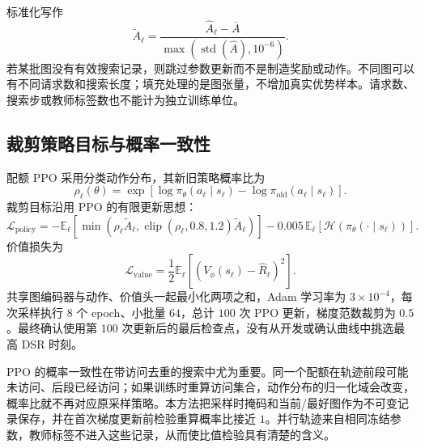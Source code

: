 标准化写作
\begin{equation}
 \widetilde A_\ell=\frac{\widehat A_\ell-\overline A}
 {\max(\operatorname{std}(\widehat A),10^{-6})}.
 \label{legacy:eq:ch5-adv-normalization}
\end{equation}
若某批图没有有效搜索记录，则跳过参数更新而不是制造奖励或动作。不同图可以有不同请求数和搜索长度；填充处理的是图张量，不增加真实优势样本。请求数、搜索步或教师标签数也不能计为独立训练单位。

\subsection{裁剪策略目标与概率一致性}

配额 PPO 采用分类动作分布，其新旧策略概率比为
\begin{equation}
 \rho_\ell(\theta)=
 \exp\left[\log\pi_\theta(a_\ell\mid s_\ell)
          -\log\pi_{\mathrm{old}}(a_\ell\mid s_\ell)\right].
 \label{legacy:eq:ch5-search-ratio}
\end{equation}
裁剪目标沿用 PPO 的有限更新思想\cite{schulman2017proximal}：
\begin{equation}
 \mathcal L_{\mathrm{policy}}=-\mathbb E_\ell\left[
 \min\left(\rho_\ell\widetilde A_\ell,
 \operatorname{clip}(\rho_\ell,0.8,1.2)\widetilde A_\ell\right)\right]
 -0.005\,\mathbb E_\ell[\mathcal H(\pi_\theta(\cdot\mid s_\ell))].
 \label{legacy:eq:ch5-search-ppo}
\end{equation}
价值损失为
\begin{equation}
 \mathcal L_{\mathrm{value}}=
 \frac12\mathbb E_\ell\left[(V_\phi(s_\ell)-\widehat R_\ell)^2\right].
 \label{legacy:eq:ch5-search-value}
\end{equation}
共享图编码器与动作、价值头一起最小化两项之和，Adam 学习率为 $3\times10^{-4}$，每次采样执行 $8$ 个 epoch、小批量 $64$，总计 $100$ 次 PPO 更新，梯度范数裁剪为 $0.5$。最终确认使用第 $100$ 次更新后的最后检查点，没有从开发或确认曲线中挑选最高 DSR 时刻。

PPO 的概率一致性在带访问去重的搜索中尤为重要。同一个配额在轨迹前段可能未访问、后段已经访问；如果训练时重算访问集合，动作分布的归一化域会改变，概率比就不再对应原采样策略。本方法把采样时掩码和当前/最好图作为不可变记录保存，并在首次梯度更新前检验重算概率比接近 $1$。并行轨迹来自相同冻结参数，教师标签不进入这些记录，从而使比值检验具有清楚的含义。

